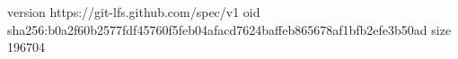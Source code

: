 version https://git-lfs.github.com/spec/v1
oid sha256:b0a2f60b2577fdf45760f5feb04afacd7624baffeb865678af1bfb2efe3b50ad
size 196704

